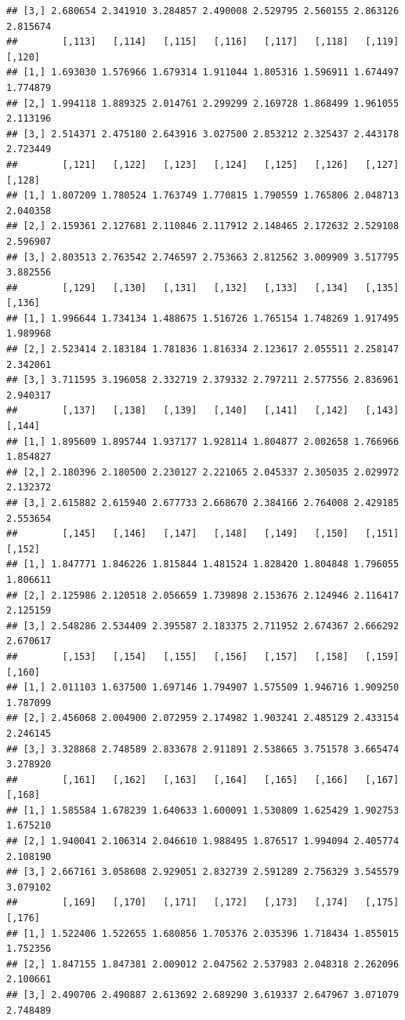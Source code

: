 \documentclass[article]{jss}\usepackage[]{graphicx}\usepackage[]{xcolor}
\makeatletter
\newenvironment{kframe}{%
 \def\at@end@of@kframe{}%
 \ifinner\ifhmode%
  \def\at@end@of@kframe{\end{minipage}}%
  \begin{minipage}{\columnwidth}%
 \fi\fi%
 \def\FrameCommand##1{\hskip\@totalleftmargin \hskip-\fboxsep
 \colorbox{shadecolor}{##1}\hskip-\fboxsep
     \hskip-\linewidth \hskip-\@totalleftmargin \hskip\columnwidth}%
 \MakeFramed {\advance\hsize-\width
   \@totalleftmargin\z@ \linewidth\hsize
   \@setminipage}}%
 {\par\unskip\endMakeFramed%
 \at@end@of@kframe}
\newenvironment{knitrout}{}{} %
\makeatother
\begin{document}
\begin{knitrout}
\begin{kframe}
\begin{verbatim}
## [3,] 2.680654 2.341910 3.284857 2.490008 2.529795 2.560155 2.863126 2.815674
##        [,113]   [,114]   [,115]   [,116]   [,117]   [,118]   [,119]   [,120]
## [1,] 1.693030 1.576966 1.679314 1.911044 1.805316 1.596911 1.674497 1.774879
## [2,] 1.994118 1.889325 2.014761 2.299299 2.169728 1.868499 1.961055 2.113196
## [3,] 2.514371 2.475180 2.643916 3.027500 2.853212 2.325437 2.443178 2.723449
##        [,121]   [,122]   [,123]   [,124]   [,125]   [,126]   [,127]   [,128]
## [1,] 1.807209 1.780524 1.763749 1.770815 1.790559 1.765806 2.048713 2.040358
## [2,] 2.159361 2.127681 2.110846 2.117912 2.148465 2.172632 2.529108 2.596907
## [3,] 2.803513 2.763542 2.746597 2.753663 2.812562 3.009909 3.517795 3.882556
##        [,129]   [,130]   [,131]   [,132]   [,133]   [,134]   [,135]   [,136]
## [1,] 1.996644 1.734134 1.488675 1.516726 1.765154 1.748269 1.917495 1.989968
## [2,] 2.523414 2.183184 1.781836 1.816334 2.123617 2.055511 2.258147 2.342061
## [3,] 3.711595 3.196058 2.332719 2.379332 2.797211 2.577556 2.836961 2.940317
##        [,137]   [,138]   [,139]   [,140]   [,141]   [,142]   [,143]   [,144]
## [1,] 1.895609 1.895744 1.937177 1.928114 1.804877 2.002658 1.766966 1.854827
## [2,] 2.180396 2.180500 2.230127 2.221065 2.045337 2.305035 2.029972 2.132372
## [3,] 2.615882 2.615940 2.677733 2.668670 2.384166 2.764008 2.429185 2.553654
##        [,145]   [,146]   [,147]   [,148]   [,149]   [,150]   [,151]   [,152]
## [1,] 1.847771 1.846226 1.815844 1.481524 1.828420 1.804848 1.796055 1.806611
## [2,] 2.125986 2.120518 2.056659 1.739898 2.153676 2.124946 2.116417 2.125159
## [3,] 2.548286 2.534409 2.395587 2.183375 2.711952 2.674367 2.666292 2.670617
##        [,153]   [,154]   [,155]   [,156]   [,157]   [,158]   [,159]   [,160]
## [1,] 2.011103 1.637500 1.697146 1.794907 1.575509 1.946716 1.909250 1.787099
## [2,] 2.456068 2.004900 2.072959 2.174982 1.903241 2.485129 2.433154 2.246145
## [3,] 3.328868 2.748589 2.833678 2.911891 2.538665 3.751578 3.665474 3.278920
##        [,161]   [,162]   [,163]   [,164]   [,165]   [,166]   [,167]   [,168]
## [1,] 1.585584 1.678239 1.640633 1.600091 1.530809 1.625429 1.902753 1.675210
## [2,] 1.940041 2.106314 2.046610 1.988495 1.876517 1.994094 2.405774 2.108190
## [3,] 2.667161 3.058608 2.929051 2.832739 2.591289 2.756329 3.545579 3.079102
##        [,169]   [,170]   [,171]   [,172]   [,173]   [,174]   [,175]   [,176]
## [1,] 1.522406 1.522655 1.680856 1.705376 2.035396 1.718434 1.855015 1.752356
## [2,] 1.847155 1.847381 2.009012 2.047562 2.537983 2.048318 2.262096 2.100661
## [3,] 2.490706 2.490887 2.613692 2.689290 3.619337 2.647967 3.071079 2.748489

\end{verbatim}
\end{kframe}
\end{knitrout}
\end{document}

